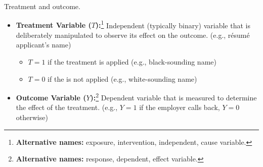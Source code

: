 \documentclass[aspectratio=169]{beamer}
\begin{document}
\begin{frame}{Treatment and outcome.}

\vspace{-0.4cm}


\begin{itemize}
    \item \textbf{Treatment Variable ($T$):}\footnote{{\scriptsize \textbf{Alternative names:} exposure, intervention, independent, cause variable.}} Independent (typically binary) variable that is 
    deliberately \textcolor{firebrick3}{manipulated} %
    to observe its effect on the outcome. \textcolor{deepskyblue3}{(e.g., résumé applicant's name)}
    \begin{itemize}
        \item[$\bullet$] $T = 1$ if the treatment is applied \textcolor{deepskyblue3}{(e.g., black-sounding name)}
        \vspace{0.1cm}
        
        \item[$\bullet$] $T = 0$ if the is not applied \textcolor{deepskyblue3}{(e.g., white-sounding name)}
    \end{itemize}
    
    \item \textbf{Outcome Variable ($Y$):}\footnote{{\scriptsize \textbf{Alternative names:} response, dependent, effect variable.}} Dependent variable that is measured to determine the effect of the treatment. \textcolor{deepskyblue3}{(e.g., $Y = 1$ if the employer calls back, $Y=0$ otherwise)}

\end{itemize}

\end{frame}


\end{document}
